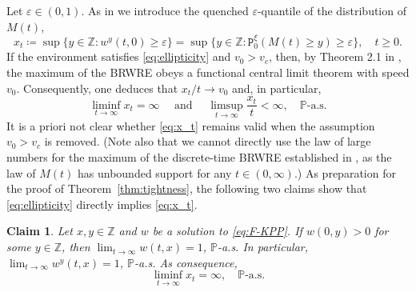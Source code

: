\documentclass[12pt,reqno,oneside]{amsart}
\numberwithin{equation}{section}
\newtheorem{claim}[theorem]{Claim}
\theoremstyle{definition}
\theoremstyle{remark}
\newcommand{\Z}{\mathbb{Z}}
\newcommand{\PP}{\mathbb{P}}
\begin{document}
Let $\varepsilon \in (0,1)$. As in \cite{CDO25} we introduce the quenched
$\varepsilon$-quantile of the distribution of $M(t)$,
\begin{equation}\label{eq:def_x_t}
  x_t\coloneq \sup\{y \in \Z: w^{y}(t,0) \geq \varepsilon\}
  = \sup \{y \in \Z: \mathtt{P}_0^\xi(M(t) \geq y) \geq \varepsilon \},
  \quad t \geq 0.
\end{equation}
If the environment satisfies \eqref{eq:ellipticity}
and $v_0>v_c$, then, by Theorem 2.1 in \cite{CD20}, the maximum of the BRWRE
obeys a functional central limit theorem with speed $v_0$. Consequently, one
deduces that $x_t /t \rightarrow v_0$ and, in particular,
\begin{equation}\label{eq:x_t}
  \liminf_{t \rightarrow \infty} x_t
  = \infty \quad\text{ and }  \quad
  \limsup_{t \rightarrow \infty} \frac{x_t}{t}< \infty,
  \quad \PP\text{-a.s.}
\end{equation}
It is a priori not clear whether \eqref{eq:x_t} remains valid when the
assumption $v_0>v_c$ is removed.
(Note also that we cannot directly use the law of large numbers for the maximum of the discrete-time BRWRE established in \cite{CP07}, as  the law of $M(t)$ has unbounded support for any $t \in (0,\infty)$.)
As preparation for the proof
of Theorem~\ref{thm:tightness}, the following two claims show that
\eqref{eq:ellipticity} directly implies \eqref{eq:x_t}.

\begin{claim}
  \label{claim:wave}
  Let $x,y \in \Z$ and $w$ be a solution to \eqref{eq:F-KPP}. If $w(0,y) > 0$ for some $y \in \Z$, then
  $\lim_{t \to \infty} w(t,x) = 1$, $\PP$-a.s.
  In particular, $\lim_{t \to \infty} w^y(t,x) = 1$,
  $\PP$-a.s. As consequence,
  \begin{equation}\label{eq:lim_x_t_claim}
    \liminf_{t \rightarrow \infty} x_t =\infty, \quad \PP\text{-a.s.}
  \end{equation}
\end{claim}
\end{document}
